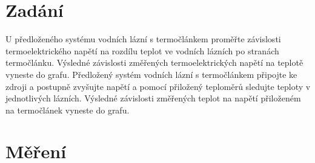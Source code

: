 \documentclass{article}
\begin{document}


\begin{minipage}[t]{\textwidth}
  \section*{Zadání}
  U předloženého systému vodních lázní s termočlánkem proměřte závislosti termoelektrického napětí na rozdílu teplot ve vodních lázních po stranách termočlánku.
  Výsledné závislosti změřených termoelektrických napětí na teplotě vyneste do grafu.
  Předložený systém vodních lázní s termočlánkem připojte ke zdroji a postupně zvyšujte napětí a pomocí přiložený teploměrů sledujte teploty v jednotlivých lázních.
  Výsledné závislosti změřených teplot na napětí přiloženém na termočlánek vyneste do grafu.
\end{minipage}


\section{Měření}
\end{document}
